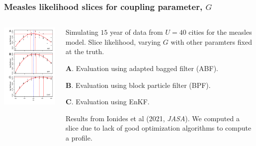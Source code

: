 \documentclass{beamer}
\begin{document}
\begin{frame}

\frametitle{Measles likelihood slices for coupling parameter, $G$}

\vspace{-5mm}

\begin{columns}[T] %
\begin{column}{.55\textwidth}
  \includegraphics[width=6cm]{slice_combined_plot-1.pdf}
\end{column}
\begin{column}{.52\textwidth}

  \vspace{6mm}
  
  Simulating $15$ year of data from $U=40$ cities for the measles model.
  Slice likelihood, varying $G$ with other paramters fixed at the truth.

  \vspace{3mm}

  {\bf A}. Evaluation using adapted bagged filter (ABF).

    \vspace{3mm}

  {\bf B}. Evaluation using block particle filter (BPF).

    \vspace{3mm}

  {\bf C}. Evaluation using EnKF.

  \vspace{3mm}
  
Results from Ionides et al (2021, {\it JASA}). We computed a slice due to lack of good optimization algorithms to compute a profile.
  
\end{column}
\end{columns}

\end{frame}
\end{document}
